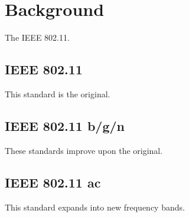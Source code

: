 \chapter{Background}

The IEEE 802.11.

\section{IEEE 802.11}

This standard is the original.

\section{IEEE 802.11 b/g/n}

These standards improve upon the original.

\section{IEEE 802.11 ac}

This standard expands into new frequency bands.

